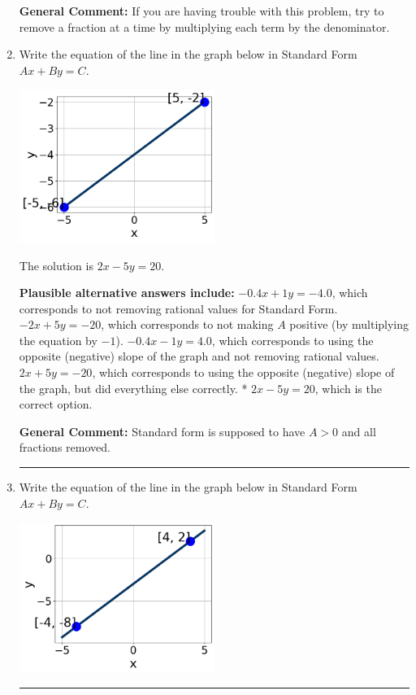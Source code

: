 \documentclass{extbook}[14pt]
\newcommand{\litem}[1]{\item #1

\rule{\textwidth}{0.4pt}}
\begin{document}
\begin{enumerate}
{\textbf{General Comment:} If you are having trouble with this problem, try to remove a fraction at a time by multiplying each term by the denominator.
}
\litem{
Write the equation of the line in the graph below in Standard Form $Ax+By=C$.

\begin{center}
    \includegraphics[width=0.5\textwidth]{../Figures/linearGraphToStandardB.png}
\end{center}


The solution is \( 2x - 5y = 20 \).\begin{enumerate}[label=\Alph*.]
\textbf{Plausible alternative answers include:} $-0.4x + 1y = -4.0$, which corresponds to not removing rational values for Standard Form.
 $-2x + 5y = -20$, which corresponds to not making $A$ positive (by multiplying the equation by $-1$).
 $-0.4x - 1y = 4.0$, which corresponds to using the opposite (negative) slope of the graph and not removing rational values.
 $2x + 5y = -20$, which corresponds to using the opposite (negative) slope of the graph, but did everything else correctly.
* $2x - 5y = 20$, which is the correct option.
\end{enumerate}

\textbf{General Comment:} Standard form is supposed to have $A > 0$ and all fractions removed.
}
\litem{
Write the equation of the line in the graph below in Standard Form $Ax+By=C$.

\begin{center}
    \includegraphics[width=0.5\textwidth]{../Figures/linearGraphToStandardCopyB.png}
\end{center}


}
\end{enumerate}
\end{document}
